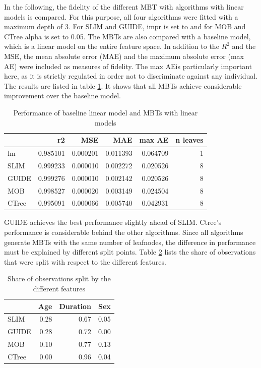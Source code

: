 In the following, the fidelity of the different MBT with algorithms with linear models is compared. For this purpose, all four algorithms were fitted with a maximum depth of 3. For SLIM and GUIDE, impr is set to and for MOB and CTree alpha is set to 0.05. The MBTs are also compared with a baseline model, which is a linear model on the entire feature space. In addition to the $R^2$ and the MSE, the mean absolute error (MAE) and the maximum absolute error (max AE) were included as measures of fidelity. The max AEis particularly important here, as it is strictly regulated in order not to discriminate against any individual. 
The results are listed in table \ref{tab:ins_k2204_lm_surrogates_perf}. It shows that all MBTs achieve considerable improvement over the baseline model.

\begin{table}[!htb]

\caption{Performance of baseline linear model and MBTs with linear models}
\centering
\begin{tabular}[t]{l|r|r|r|r|r}
\hline
  & r2 & MSE & MAE & max AE & n leaves\\
\hline
lm & 0.985101 & 0.000201 & 0.011393 & 0.064709 & 1\\
\hline
SLIM & 0.999233 & 0.000010 & 0.002272 & 0.020526 & 8\\
GUIDE & 0.999276 & 0.000010 & 0.002142 & 0.020526 & 8\\
MOB & 0.998527 & 0.000020 & 0.003149 & 0.024504 & 8\\
CTree & 0.995091 & 0.000066 & 0.005740 & 0.042931 & 8\\
\hline
\end{tabular}
\label{tab:ins_k2204_lm_surrogates_perf}
\end{table}

GUIDE achieves the best performance slightly ahead of SLIM. Ctree's performance is considerable behind the other algorithms.
Since all algorithms generate MBTs with the same number of leafnodes, the difference in performance must be explained by different split points.
Table \ref{tab:ins_k2204_lm_surrogates_share} lists the share of observations that were split with respect to the different features.

\begin{table}[!htb]

\caption{Share of observations split by the different features}
\centering
\begin{tabular}[t]{l|r|r|r}
\hline
& Age & Duration & Sex\\
\hline
SLIM & 0.28 & 0.67 & 0.05\\
GUIDE & 0.28 & 0.72 & 0.00\\
MOB & 0.10 & 0.77 & 0.13\\
CTree & 0.00 & 0.96 & 0.04\\
\hline
\end{tabular}
\label{tab:ins_k2204_lm_surrogates_share}
\end{table}

